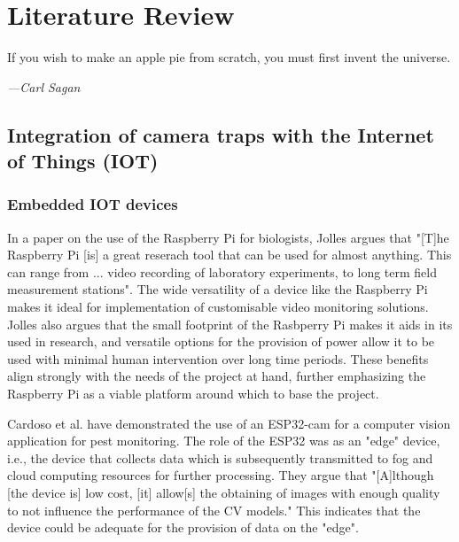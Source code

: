 \documentclass[class=report,11pt,crop=false]{standalone}
\begin{document}
\ifstandalone
\tableofcontents
\fi
\chapter{Literature Review \label{ch:literature}}
\epigraph{If you wish to make an apple pie from scratch, you must first invent the universe.}%
    {\emph{---Carl Sagan}}
\vspace{0.5cm}

\section{Integration of camera traps with the Internet of Things (IOT)}

\subsection{Embedded IOT devices}

In a paper on the use of the Raspberry Pi for biologists, Jolles \cite{Jolles-Broad-scale} argues that "[T]he Raspberry Pi [is] a great reserach tool that can be used for almost anything. This can range from ... video recording of laboratory experiments, to long term field measurement stations". The wide versatility of a device like the Raspberry Pi makes it ideal for implementation of customisable video monitoring solutions. Jolles \cite{Jolles-Broad-scale} also argues that the small footprint of the Rasbperry Pi makes it aids in its used in research, and versatile options for the provision of power allow it to be used with minimal human intervention over long time periods. These benefits align strongly with the needs of the project at hand, further emphasizing the Raspberry Pi as a viable platform around which to base the project.

Cardoso et al. \cite{Cardoso-InternetOf} have demonstrated the use of an ESP32-cam for a computer vision application for pest monitoring. The role of the ESP32 was as an "edge" device, i.e., the device that collects data which is subsequently transmitted to fog and cloud computing resources for further processing. They \cite{Cardoso-InternetOf} argue that "[A]lthough [the device is] low cost, [it] allow[s] the obtaining of images with enough quality to not influence the performance of the CV models." This indicates that the device could be adequate for the provision of data on the "edge".
\end{document}
